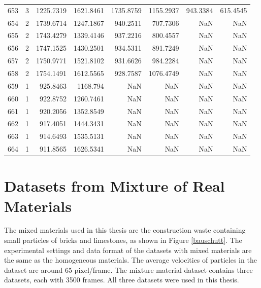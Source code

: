 \begin{table}[ht]
\begin{tabular}{@{}rcrrrrrr@{}}
    653     & 3    & 1225.7319 & 1621.8461 & 1735.8759 & 1155.2937 & 943.3384 & 615.4545 \\
    654     & 2    & 1739.6714 & 1247.1867 & 940.2511  & 707.7306  & NaN      & NaN      \\
    655     & 2    & 1743.4279 & 1339.4146 & 937.2216  & 800.4557  & NaN      & NaN      \\
    656     & 2    & 1747.1525 & 1430.2501 & 934.5311  & 891.7249  & NaN      & NaN      \\
    657     & 2    & 1750.9771 & 1521.8102 & 931.6626  & 984.2284  & NaN      & NaN      \\
    658     & 2    & 1754.1491 & 1612.5565 & 928.7587  & 1076.4749 & NaN      & NaN      \\
    659     & 1    & 925.8463  & 1168.794  & NaN       & NaN       & NaN      & NaN      \\
    660     & 1    & 922.8752  & 1260.7461 & NaN       & NaN       & NaN      & NaN      \\
    661     & 1    & 920.2056  & 1352.8549 & NaN       & NaN       & NaN      & NaN      \\
    662     & 1    & 917.4051  & 1444.3431 & NaN       & NaN       & NaN      & NaN      \\
    663     & 1    & 914.6493  & 1535.5131 & NaN       & NaN       & NaN      & NaN      \\
    664     & 1    & 911.8565  & 1626.5341 & NaN       & NaN       & NaN      & NaN      \\ \bottomrule
    \end{tabular}
    \normalsize
    
    \label{table:Sample of CSV}
    \end{table}


    
\section{Datasets from Mixture of Real Materials}


The mixed materials used in this thesis are the construction waste containing small particles of bricks and limestones, as shown in Figure \ref{bauschutt}. The experimental settings and data format of the datasets with mixed materials are the same as the homogeneous materials. The average velocities of particles in the dataset are around 65 pixel/frame. 
The mixture material dataset contains three datasets, each with 3500 frames. All three datasets were used in this thesis.

